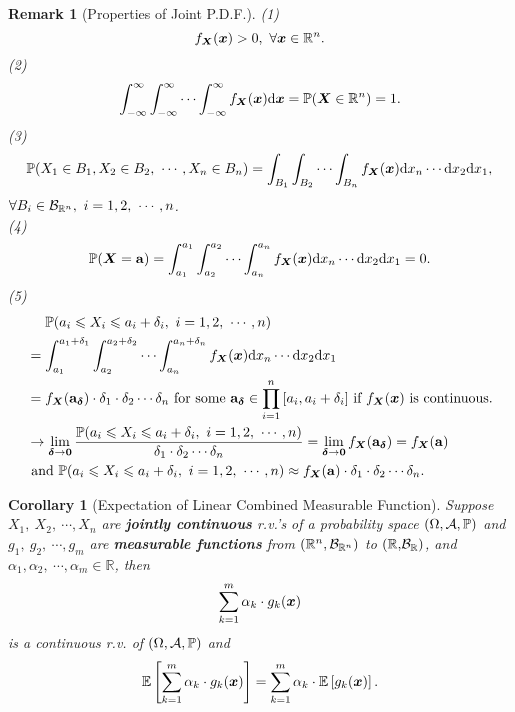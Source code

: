 \documentclass[openany,12pt]{book}
\newtheorem{corollary}{Corollary}[chapter]
\newtheorem{remark}{Remark}[chapter]
\begin{document}
\begin{remark}[Properties of Joint P.D.F.]
(1)
\[f_{\bm{X}}(\bm{x}) > 0,\ \forall\bm{x} \in \mathbb{R}^{n}.\]
(2)
\[\int_{- \infty}^{\infty}{\int_{- \infty}^{\infty}{\cdots\int_{- \infty}^{\infty}{f_{\bm{X}}(\bm{x})\mathrm{d}\bm{x}}}} = \mathbb{P}(\bm{X} \in \mathbb{R}^{n}) = 1.\]
(3)
\[\mathbb{P}( X_{1} \in B_{1},X_{2} \in B_{2},\ \cdots,X_{n} \in B_{n}) = \int_{B_{1}}^{}{\int_{B_{2}}^{}{\cdots\int_{B_{n}}^{}{f_{\mX}(\mx)\dif x_{n}\cdots \dif x_{2}}}}\dif x_{1},\]
$\forall B_{i} \in \mb_{\mathbb{R}^{n}},\ i = 1,2,\ \cdots,n$.\\
(4)
\[\mathbb{P}(\bm{X} = \mathbf{a}) = \int_{a_{1}}^{a_{1}}{\int_{a_{2}}^{a_{2}}{\cdots\int_{a_{n}}^{a_{n}}{f_{\bm{X}}(\bm{x})\mathrm{d} x_{n}\cdots \mathrm{d} x_{2}}}}\mathrm{d} x_{1} = 0.\]
(5)
\[\begin{aligned}
&\quad\  \mathbb{P}(a_{i} \leqslant X_{i} \leqslant a_{i} + \delta_{i},\ i = 1,2,\ \cdots,n)\\
&= \int_{a_{1}}^{a_{1} + \delta_{1}}{\int_{a_{2}}^{a_{2} + \delta_{2}}{\cdots\int_{a_{n}}^{a_{n} + \delta_{n}}{f_{\bm{X}}(\bm{x})\mathrm{d} x_{n}\cdots \mathrm{d} x_{2}}}}\mathrm{d} x_{1}\\
&= f_{\bm{X}}( {\mathbf{a}}_{\bm{\delta}} ) \cdot \delta_{1} \cdot \delta_{2} \cdots\delta_{n} \text{ for some }{\mathbf{a}}_{\bm{\delta}} \in \prod_{i = 1}^{n}{[ a_{i},a_{i} + \delta_{i}]} \text{ if } f_{\bm{X}}(\bm{x}) \text{ is continuous}.\\
&\to \lim_{\bm{\delta}\to\mathbf{0}}\frac{\mathbb{P}(a_{i} \leqslant X_{i} \leqslant a_{i} + \delta_{i},\ i = 1,2,\ \cdots,n)}{\delta_{1} \cdot \delta_{2} \cdots \delta_{n}} = \lim_{\bm{\delta}\to\mathbf{0}}{f_{\bm{X}}( {\mathbf{a}}_{\bm{\delta}} )} = f_{\bm{X}}(\mathbf{a})\\
&\ \text{and } \mathbb{P}(a_{i} \leqslant X_{i} \leqslant a_{i} + \delta_{i},\ i = 1,2,\ \cdots,n) \approx f_{\bm{X}}(\mathbf{a}) \cdot \delta_{1} \cdot \delta_{2} \cdots\delta_{n}.\\
\end{aligned}\]
\end{remark}

\begin{corollary}[Expectation of Linear Combined Measurable Function]
Suppose $X_{1},\ X_{2},\ \cdots,X_{n}$ are \textbf{jointly continuous}
r.v.'s of a probability space $(\Omega,\mathcal{A},\mathbb{P})$ and $g_{1},\ g_{2},\ \cdots, g_{m}$ are \textbf{measurable functions} from $(\mathbb{R}^{n}, \mathcal{B}_{\mathbb{R}^{n}})$ to $\mathbb{(R,}\mathcal{B}_{\mathbb{R}})$, and $\alpha_{1},\alpha_{2},\ \cdots,\alpha_{m} \in \mathbb{R}$, then
\[\sum_{k = 1}^{m}\alpha_{k}\cdot g_{k}(\bm{x})
\]
is a continuous r.v. of $(\Omega,\mathcal{A},\mathbb{P})$ and 
\[\mathbb{E}\left[ \sum_{k = 1}^{m}\alpha_{k}\cdot g_{k}(\bm{x}) \right] = \sum_{k = 1}^{m}\alpha_{k}\cdot \mathbb{E}\left[ g_{k}(\bm{x}) \right].\]
\end{corollary}
\end{document}
